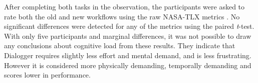 
After completing both tasks in the observation, the participants were asked to
rate both the old and new workflows using the raw NASA-TLX metrics
\citep{Hart1988}.
No significant differences were detected for any of the metrics using the paired \textit{t}-test.
With only five participants and marginal differences, it was not possible to
draw any conclusions about cognitive load from these results.  They indicate
that Dialogger requires slightly less effort and mental demand, and is less
frustrating.
However it is considered more physically demanding, temporally
demanding and scores lower in performance.



